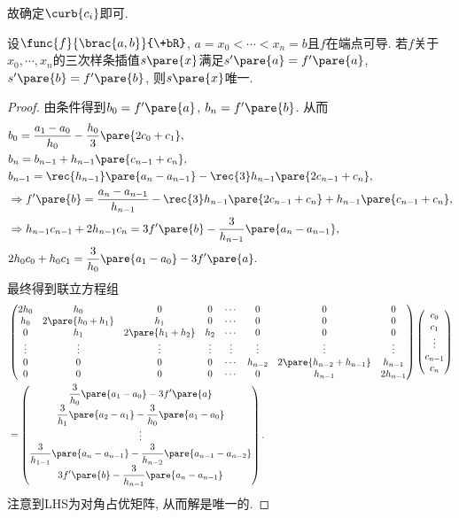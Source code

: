 \documentclass[hidelinks]{ctexart}
\begin{document}
故确定$\curb{c_i}$即可.
\begin{theorem}
    设$\func{f}{\brac{a,b}}{\+bR}$, $a=x_0<\cdots<x_n = b$且$f$在端点可导. 若$f$关于$x_0, \cdots, x_n$的三次样条插值$s\pare{x}$满足$s'\pare{a} = f'\pare{a}$, $s'\pare{b} = f'\pare{b}$, 则$s\pare{x}$唯一.
\end{theorem}
\begin{proof}
    由条件得到$b_0 = f'\pare{a}$, $b_n = f'\pare{b}$. 从而
    \begin{align*}
        & b_0 = \frac{a_1 - a_0}{h_0} - \frac{h_0}{3}\pare{2c_0 + c_1}, \\
        & b_n = b_{n-1} + h_{n-1}\pare{c_{n-1} + c_n}, \\
        & b_{n-1} = \rec{h_{n-1}}\pare{a_n - a_{n-1}} - \rec{3} h_{n-1}\pare{2c_{n-1}+c_n}, \\
        & \Rightarrow f'\pare{b} = \frac{a_n - a_{n-1}}{h_{n-1}} - \rec{3}h_{n-1}\pare{2c_{n-1} + c_n} + h_{n-1}\pare{c_{n-1}+c_n}, \\
        & \Rightarrow h_{n-1}c_{n-1} + 2h_{n-1}c_n = 3f'\pare{b} - \frac{3}{h_{n-1}}\pare{a_n - a_{n-1}}, \\
        & 2h_0 c_0 + h_0 c_1 = \frac{3}{h_0}\pare{a_1 - a_0} - 3f'\pare{a}.
    \end{align*}
    最终得到联立方程组
    \begin{align*}
        & \begin{pmatrix}
            2h_0 & h_0 & 0 & 0 & \cdots & 0 & 0 & 0 \\
            h_0 & 2\pare{h_0+h_1} & h_1 & 0 & \cdots & 0 & 0 & 0 \\
            0 & h_1 & 2\pare{h_1+h_2} & h_2 & \cdots & 0 & 0 & 0 \\
            \vdots & \vdots & \vdots & \vdots & \vdots & \vdots & \vdots & \vdots \\
            0 & 0 & 0 & 0 & \cdots & h_{n-2} & 2\pare{h_{n-2} + h_{n-1}} & h_{n-1} \\
            0 & 0 & 0 & 0 & \cdots & 0 & h_{n-1} & 2h_{n-1}
        \end{pmatrix} \begin{pmatrix}
            c_0 \\ c_1 \\ \vdots \\ c_{n-1} \\ c_n
        \end{pmatrix}\\ &= \begin{pmatrix}
            \displaystyle \frac{3}{h_0}\pare{a_1 - a_0} - 3f'\pare{a} \\
            \displaystyle \frac{3}{h_1}\pare{a_2 - a_1} - \frac{3}{h_0}\pare{a_1 - a_0}\\
            \vdots \\
            \displaystyle \frac{3}{h_{1-1}}\pare{a_n - a_{n-1}} - \frac{3}{h_{n-2}}\pare{a_{n-1} - a_{n-2}}\\
            \displaystyle 3f'\pare{b} - \frac{3}{h_{n-1}}\pare{a_n - a_{n-1}}
        \end{pmatrix}.
    \end{align*}
    注意到LHS为对角占优矩阵, 从而解是唯一的.
\end{proof}
\end{document}
